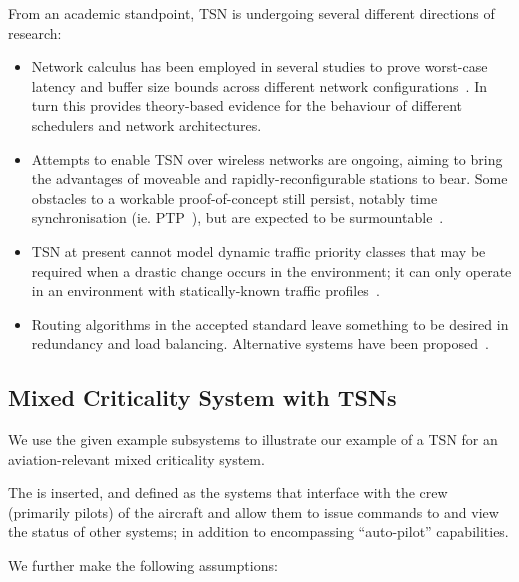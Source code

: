 From an academic standpoint, TSN is undergoing several different directions of research:

\begin{itemize}
    \item Network calculus has been employed in several studies to prove worst-case latency and buffer size bounds across different network configurations~\cite{maileNetworkCalculusResults2020}.
    In turn this provides theory-based evidence for the behaviour of different schedulers and network architectures.
    \item Attempts to enable TSN over wireless networks are ongoing, aiming to bring the advantages of moveable and rapidly-reconfigurable stations to bear.
    Some obstacles to a workable proof-of-concept still persist, notably time synchronisation (ie. PTP~\cite{IEEEStandardLocal2020}), but are expected to be surmountable~\cite{mildnerTimeSensitiveNetworking2019}.
    \item TSN at present cannot model dynamic traffic priority classes that may be required when a drastic change occurs in the environment; it can only operate in an environment with statically-known traffic profiles~\cite{seolTimelySurveyTimeSensitive2021}.
    \item Routing algorithms in the accepted standard leave something to be desired in redundancy and load balancing.
    Alternative systems have been proposed~\cite{atallahRoutingSchedulingTimeTriggered2020}.
\end{itemize}

\subsection{Mixed Criticality System with TSNs}

We use the given example subsystems to illustrate our example of a TSN for an aviation-relevant mixed criticality system.

The  is inserted, and defined as the systems that interface with the crew (primarily pilots) of the aircraft and allow them to issue commands to and view the status of other systems; in addition to encompassing ``auto-pilot'' capabilities.

We further make the following assumptions:

